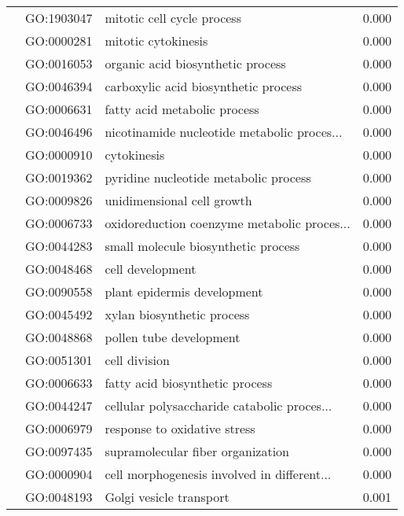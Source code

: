 \begin{longtable}{lllr}
   & GO:1903047 &                   mitotic cell cycle process &         0.000 \\
   & GO:0000281 &                          mitotic cytokinesis &         0.000 \\
   & GO:0016053 &            organic acid biosynthetic process &         0.000 \\
   & GO:0046394 &         carboxylic acid biosynthetic process &         0.000 \\
   & GO:0006631 &                 fatty acid metabolic process &         0.000 \\
   & GO:0046496 &  nicotinamide nucleotide metabolic proces... &         0.000 \\
   & GO:0000910 &                                  cytokinesis &         0.000 \\
   & GO:0019362 &        pyridine nucleotide metabolic process &         0.000 \\
   & GO:0009826 &                   unidimensional cell growth &         0.000 \\
   & GO:0006733 &  oxidoreduction coenzyme metabolic proces... &         0.000 \\
   & GO:0044283 &          small molecule biosynthetic process &         0.000 \\
   & GO:0048468 &                             cell development &         0.000 \\
   & GO:0090558 &                  plant epidermis development &         0.000 \\
   & GO:0045492 &                   xylan biosynthetic process &         0.000 \\
   & GO:0048868 &                      pollen tube development &         0.000 \\
   & GO:0051301 &                                cell division &         0.000 \\
   & GO:0006633 &              fatty acid biosynthetic process &         0.000 \\
   & GO:0044247 &  cellular polysaccharide catabolic proces... &         0.000 \\
   & GO:0006979 &                 response to oxidative stress &         0.000 \\
   & GO:0097435 &            supramolecular fiber organization &         0.000 \\
   & GO:0000904 &  cell morphogenesis involved in different... &         0.000 \\
   & GO:0048193 &                      Golgi vesicle transport &         0.001 \\

\end{longtable}
